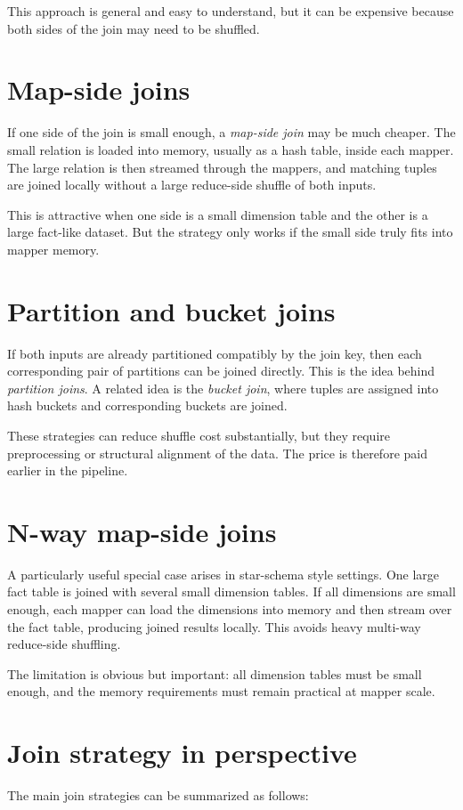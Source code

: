 \documentclass[11pt,a4paper,openany]{book}
\begin{document}
This approach is general and easy to understand, but it can be expensive because both sides of the join may need to be shuffled.

\section{Map-side joins}
If one side of the join is small enough, a \emph{map-side join} may be much cheaper. The small relation is loaded into memory, usually as a hash table, inside each mapper. The large relation is then streamed through the mappers, and matching tuples are joined locally without a large reduce-side shuffle of both inputs.

This is attractive when one side is a small dimension table and the other is a large fact-like dataset. But the strategy only works if the small side truly fits into mapper memory.

\section{Partition and bucket joins}
If both inputs are already partitioned compatibly by the join key, then each corresponding pair of partitions can be joined directly. This is the idea behind \emph{partition joins}. A related idea is the \emph{bucket join}, where tuples are assigned into hash buckets and corresponding buckets are joined.

These strategies can reduce shuffle cost substantially, but they require preprocessing or structural alignment of the data. The price is therefore paid earlier in the pipeline.

\section{N-way map-side joins}
A particularly useful special case arises in star-schema style settings. One large fact table is joined with several small dimension tables. If all dimensions are small enough, each mapper can load the dimensions into memory and then stream over the fact table, producing joined results locally. This avoids heavy multi-way reduce-side shuffling.

The limitation is obvious but important: all dimension tables must be small enough, and the memory requirements must remain practical at mapper scale.

\section{Join strategy in perspective}
The main join strategies can be summarized as follows:
\end{document}
